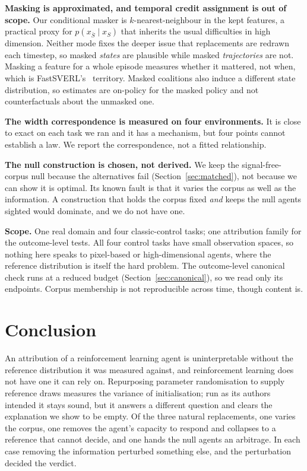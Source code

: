 \documentclass[10pt,twocolumn]{article}
\newcommand{\elsewhere}[1]{Section~\ref{#1}}
\begin{document}
\textbf{Masking is approximated, and temporal credit assignment is out of
scope.} Our conditional masker is $k$-nearest-neighbour in the kept features, a
practical proxy for $p(x_{\bar S} \mid x_S)$ that inherits the usual
difficulties in high dimension. Neither mode fixes the deeper issue that
replacements are redrawn each timestep, so masked \emph{states} are plausible
while masked \emph{trajectories} are not. Masking a feature for a whole episode
measures whether it mattered, not when, which is
FastSVERL's~\citep{beechey2025fastsverl} territory. Masked coalitions also induce
a different state distribution, so estimates are on-policy for the masked policy
and not counterfactuals about the unmasked one.

\textbf{The width correspondence is measured on four environments.} It is close
to exact on each task we ran and it has a mechanism, but four points cannot
establish a law. We report the correspondence, not a fitted relationship.

\textbf{The null construction is chosen, not derived.} We keep the
signal-free-corpus null because the alternatives fail
(Section~\ref{sec:matched}), not because we can show it is optimal. Its known
fault is that it varies the corpus as well as the information. A construction
that holds the corpus fixed \emph{and} keeps the null agents sighted would
dominate, and we do not have one.

\textbf{Scope.} One real domain and four classic-control tasks; one attribution
family for the outcome-level tests. All four control tasks have small
observation spaces, so nothing here speaks to pixel-based or high-dimensional
agents, where the reference distribution is itself the hard problem. The
outcome-level canonical check runs at a reduced budget
(\elsewhere{sec:canonical}), so we read only its endpoints. Corpus membership
is not reproducible across time, though content is.

\section{Conclusion}

An attribution of a reinforcement learning agent is uninterpretable without the
reference distribution it was measured against, and reinforcement learning does
not have one it can rely on. Repurposing parameter randomisation to supply
reference draws measures the variance of initialisation; run as its authors
intended it stays sound, but it answers a different question and clears the
explanation we show to be empty. Of the three natural replacements, one varies the
corpus, one removes the agent's capacity to respond and collapses to a
reference that cannot decide, and one hands the null agents an arbitrage. In each case
removing the information perturbed something else, and the perturbation decided
the verdict.
\end{document}

